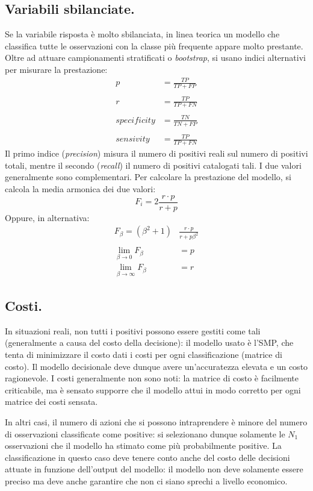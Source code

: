 \documentclass[11pt, a4page, twocolumn]{article}
\begin{document}
\subsection{Variabili sbilanciate.}
Se la variabile risposta è molto sbilanciata, in linea teorica un modello che classifica tutte le osservazioni con la classe più frequente appare molto prestante.
Oltre ad attuare campionamenti stratificati o \textit{bootstrap}, si usano indici alternativi per misurare la prestazione:
\begin{align*}
  p &= \frac{TP}{TP + FP} \\ \\
  r &= \frac{TP}{TP + FN} \\ \\
  specificity &= \frac{TN}{TN + FP} \\ \\
  sensivity &= \frac{TP}{TP + FN}
\end{align*}
Il primo indice (\textit{precision}) misura il numero di positivi reali sul numero di positivi totali, mentre il secondo (\textit{recall}) il numero di positivi catalogati tali.
I due valori generalmente sono complementari.
Per calcolare la prestazione del modello, si calcola la media armonica dei due valori:
\begin{equation*}
  F_i = 2 \frac{r \cdot p}{r + p}
\end{equation*}
Oppure, in alternativa:
\begin{align*}
  F_\beta = (\beta^2 + 1) &\frac{r \cdot p}{r + p \beta^2} \\ \\
  \lim_{\beta \to 0} F_\beta &= p \\
  \lim_{\beta \to \infty} F_\beta &= r
\end{align*}

\subsection{Costi.}
In situazioni reali, non tutti i positivi possono essere gestiti come tali (generalmente a causa del costo della decisione): il modello usato è l'SMP, che tenta di minimizzare il costo dati i costi per ogni classificazione (matrice di costo).
Il modello decisionale deve dunque avere un'accuratezza elevata e un costo ragionevole.
I costi generalmente non sono noti: la matrice di costo è facilmente criticabile, ma è sensato supporre che il modello attui in modo corretto per ogni matrice dei costi sensata.

In altri casi, il numero di azioni che si possono intraprendere è minore del numero di osservazioni classificate come positive: si selezionano dunque solamente le $N_1$ osservazioni che il modello ha stimato come più probabilmente positive.
La classificazione in questo caso deve tenere conto anche del costo delle decisioni attuate in funzione dell'output del modello: il modello non deve solamente essere preciso ma deve anche garantire che non ci siano sprechi a livello economico.
\end{document}
